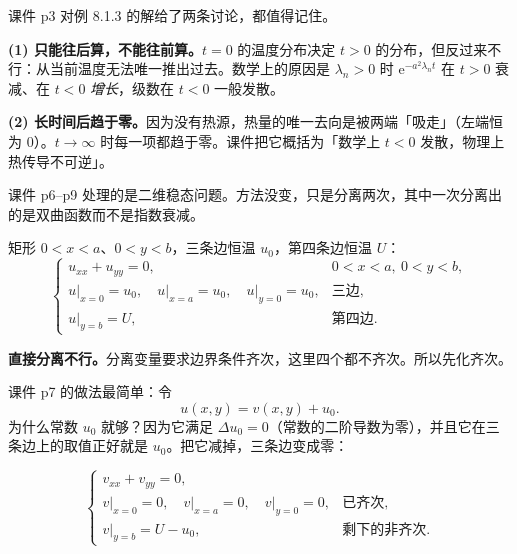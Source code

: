 \documentclass[11pt]{ctexart}
\let\origsubhdr\subhdr
\renewcommand{\subhdr}[1]{\par\needspace{3\baselineskip}\origsubhdr{#1}}
\let\orighdr\hdr
\renewcommand{\hdr}[2]{\par\needspace{6\baselineskip}\orighdr{#1}{#2}}
\begin{document}

课件 p3 对例 8.1.3 的解给了两条讨论，都值得记住。

\textbf{(1) 只能往后算，不能往前算。}$t=0$ 的温度分布决定 $t>0$ 的分布，但反过来不行：从当前温度无法唯一推出过去。数学上的原因是 $\lambda_n>0$ 时 $\mathrm e^{-a^2\lambda_nt}$ 在 $t>0$ 衰减、在 $t<0$ \emph{增长}，级数在 $t<0$ 一般发散。

\textbf{(2) 长时间后趋于零。}因为没有热源，热量的唯一去向是被两端「吸走」（左端恒为 0）。$t\to\infty$ 时每一项都趋于零。课件把它概括为「数学上 $t<0$ 发散，物理上热传导不可逆」。


\label{sec:s5}

课件 p6--p9 处理的是二维稳态问题。方法没变，只是分离两次，其中一次分离出的是双曲函数而不是指数衰减。


矩形 $0<x<a$、$0<y<b$，三条边恒温 $u_0$，第四条边恒温 $U$：
\begin{equation}
  \begin{cases}
    u_{xx}+u_{yy}=0, & 0<x<a,\ 0<y<b,\\
    u\big|_{x=0}=u_0,\quad u\big|_{x=a}=u_0,\quad u\big|_{y=0}=u_0, & \text{三边},\\
    u\big|_{y=b}=U, & \text{第四边}.
  \end{cases}
\end{equation}

\textbf{直接分离不行。}分离变量要求边界条件齐次，这里四个都不齐次。所以先化齐次。

课件 p7 的做法最简单：令
\begin{equation}
  u(x,y)=v(x,y)+u_0 .
\end{equation}
为什么常数 $u_0$ 就够？因为它满足 $\Delta u_0=0$（常数的二阶导数为零），并且它在三条边上的取值正好就是 $u_0$。把它减掉，三条边变成零：

\begin{equation}
  \begin{cases}
    v_{xx}+v_{yy}=0,\\
    v\big|_{x=0}=0,\quad v\big|_{x=a}=0,\quad v\big|_{y=0}=0, & \text{已齐次},\\
    v\big|_{y=b}=U-u_0, & \text{剩下的非齐次}.
  \end{cases}
\end{equation}
\end{document}
